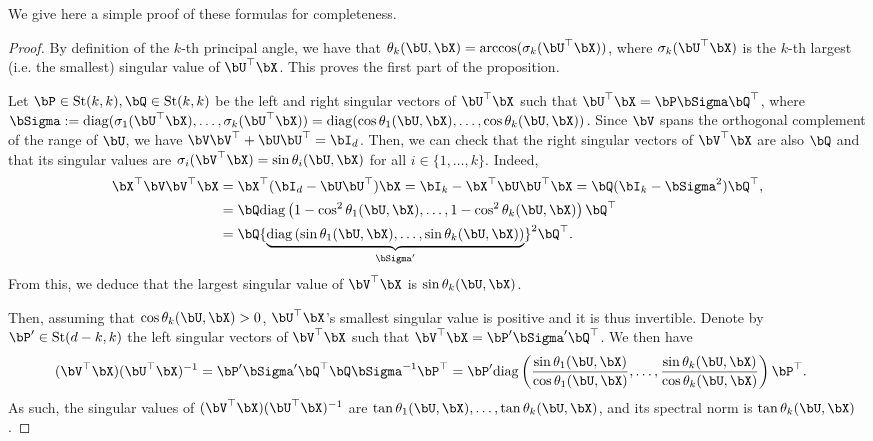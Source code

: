 \documentclass{article}
\theoremstyle{plain}
\theoremstyle{definition}
\theoremstyle{remark}
\begin{document}
We give here a simple proof of these formulas for completeness.

\begin{proof}
  By definition of the $k$-th principal angle, we have that $\theta_k(\bU, \bX) = \arccos(\sigma_k(\bU^\top \bX))$, where $\sigma_k(\bU^\top \bX)$ is the $k$-th largest (i.e. the smallest) singular value of $\bU^\top \bX$. This proves the first part of the proposition. 
  
  Let $\bP \in \mathrm{St}(k,k), \bQ \in \mathrm{St}(k,k)$ be the left and right singular vectors of $\bU^\top \bX$ such that $\bU^\top \bX = \bP \bSigma \bQ^\top$, where $\bSigma := \mathrm{diag}(\sigma_1(\bU^\top \bX), \dots, \sigma_k(\bU^\top \bX)) = \mathrm{diag}(\cos\theta_1(\bU, \bX), \dots, \cos\theta_k(\bU, \bX))$. Since $\bV$ spans the orthogonal complement of the range of $\bU$, we have $\bV\bV^\top + \bU \bU^\top = \bI_d$. Then, we can check that the right singular vectors of $\bV^\top\bX$ are also $\bQ$ and that its singular values are $\sigma_i(\bV^\top \bX) = \sin\theta_i(\bU, \bX)$ for all $i\in \{1,\dots,k\}$. Indeed,
  \begin{align*}
    \bX^\top\bV\bV^\top\bX & = \bX^\top(\bI_d - \bU\bU^\top)\bX = \bI_k - \bX^\top \bU \bU^\top \bX = \bQ(\bI_k - \bSigma^2)\bQ^\top, \\
    & = \bQ \mathrm{diag}\left(1 - \cos^2\theta_1(\bU, \bX), \dots, 1 - \cos^2\theta_k(\bU, \bX)\right) \bQ^\top \\
    & = \bQ {\underbrace{\mathrm{diag}\left(\sin\theta_1(\bU, \bX), \dots, \sin\theta_k(\bU, \bX)\right)}_{\bSigma'}}^2 \bQ^\top.
  \end{align*}
  From this, we deduce that the largest singular value of $\bV^\top \bX$ is $\sin\theta_k(\bU, \bX)$.

  Then, assuming that $\cos\theta_k(\bU, \bX) > 0$, $\bU^\top \bX$'s smallest singular value is positive and it is thus invertible. Denote by $\bP' \in \mathrm{St}(d-k,k)$ the left singular vectors of $\bV^\top \bX$ such that $\bV^\top\bX = \bP' \bSigma' \bQ^\top$. We then have
  \begin{align*}
    (\bV^\top \bX)(\bU^\top \bX)^{-1} & = \bP' \bSigma' {\bQ^\top \bQ} \bSigma^{-1} \bP^\top = \bP' \mathrm{diag}\left( \frac{\sin\theta_1(\bU, \bX)}{\cos\theta_1(\bU, \bX)}, \dots, \frac{\sin\theta_k(\bU, \bX)}{\cos\theta_k(\bU, \bX)} \right) \bP^\top.
  \end{align*}
  As such, the singular values of $(\bV^\top \bX)(\bU^\top \bX)^{-1}$ are $\tan\theta_1(\bU, \bX), \dots, \tan\theta_k(\bU, \bX)$, and its spectral norm is $\tan\theta_k(\bU, \bX)$.
\end{proof}
\end{document}

